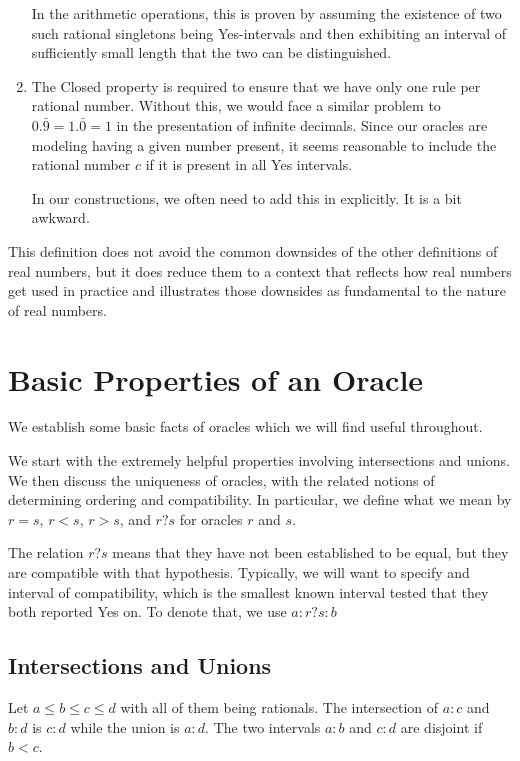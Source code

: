 \documentclass[12pt]{article}
\theoremstyle{remark}
\begin{document}
\begin{enumerate}
    In the arithmetic operations, this is proven by assuming the existence of two such rational singletons being Yes-intervals and then exhibiting an interval of sufficiently small length that the two can be distinguished. 

    \item The Closed property is required to ensure that we have only one rule per rational number. Without this, we would face a similar problem to $0.\bar{9} = 1.\bar{0} = 1$ in the presentation of infinite decimals. Since our oracles are modeling having a given number present, it seems reasonable to include the rational number $c$ if it is present in all Yes intervals. 
    
    In our constructions, we often need to add this in explicitly. It is a bit awkward.

\end{enumerate}


This definition does not avoid the common downsides of the other definitions of real numbers, but it does reduce them to a context that reflects how real numbers get used in practice and illustrates those downsides as fundamental to the nature of real numbers.  


\section{Basic Properties of an Oracle}

We establish some basic facts of oracles which we will find useful throughout. 

We start with the extremely helpful properties involving intersections and unions. We then discuss the uniqueness of oracles, with the related notions of determining ordering and compatibility. In particular, we define what we mean by $r = s$, $r<s$, $r>s$, and $r?s$ for oracles $r$ and $s$. 


The relation $r?s$ means that they have not been established to be equal, but they are compatible with that hypothesis. Typically, we will want to specify and interval of compatibility, which is the smallest known interval tested that they both reported Yes on. To denote that, we use $a:r?s:b$ 

\subsection{ Intersections and Unions}

Let $a \leq b \leq c \leq d$ with all of them being rationals. The intersection of $a:c$ and $b:d$ is $c:d$ while the union is $a:d$. The two intervals $a:b$ and $c:d$ are disjoint if $b < c$. 
\end{document}
